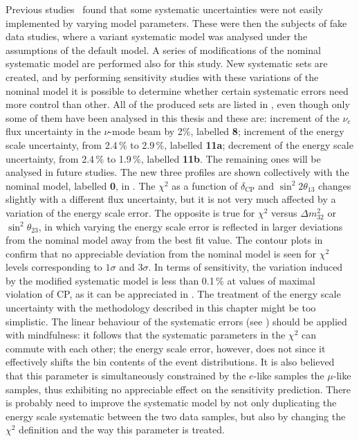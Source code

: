 Previous studies~\cite{Abe:2018wpn} found that some systematic uncertainties %
were not easily implemented by varying model parameters.
These were then the subjects of fake data studies, where a variant systematic model was analysed under %
the assumptions of the default model.
A series of modifications of the nominal systematic model are performed also for this study.
New systematic sets are created, and by performing sensitivity studies with these variations of the nominal model %
it is possible to determine whether certain systematic errors need more control than other.
All of the produced sets are listed in , even though only %
some of them have been analysed in this thesis and these are:
increment of the $\nu_e$ flux uncertainty in the $\nu$-mode beam by 2\%, labelled \textbf{8}; %
increment of the energy scale uncertainty, from 2.4\,\% to 2.9\,\%, labelled \textbf{11a}; %
decrement of the energy scale uncertainty, from 2.4\,\% to 1.9\,\%, labelled \textbf{11b}.
The remaining ones will be analysed in future studies.
The new three profiles are shown collectively with the nominal model, labelled \textbf{0}, in .
The $\chi^2$ as a function of $\delta_\text{CP}$ and $\sin^2 2\theta_{13}$ changes slightly with a different flux uncertainty, %
but it is not very much affected by a variation of the energy scale error.
The opposite is true for $\chi^2$ versus $\Delta m_{32}^2$ or $\sin^2\theta_{23}$, in which %
varying the energy scale error is reflected in larger deviations from the nominal model away from the best fit value.
The contour plots in  confirm that no appreciable deviation from the nominal model %
is seen for $\chi^2$ levels corresponding to $1\sigma$ and $3\sigma$.
In terms of sensitivity, the variation induced by the modified systematic model is %
less than 0.1\,\% at values of maximal violation of CP, as it can be appreciated in .
The treatment of the energy scale uncertainty with the methodology described in this chapter might be too simplistic.
The linear behaviour of the systematic errors (see ) should be applied with mindfulness: %
it follows that the systematic parameters in the $\chi^2$ can commute with each other; %
the energy scale error, however, does not since it effectively shifts the bin contents of the event distributions.
It is also believed that this parameter is simultaneously constrained by the $e$-like samples %
the $\mu$-like samples, thus exhibiting no appreciable effect on the sensitivity prediction.
There is probably need to improve the systematic model by not only duplicating the energy scale systematic %
between the two data samples, but also by changing the $\chi^2$ definition and the way this parameter is treated.

